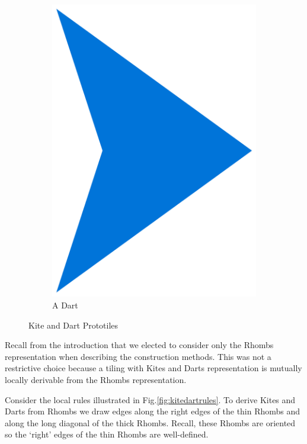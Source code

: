 \documentclass[
  oneside,
  11pt, a4paper,
  footinclude=true,
  headinclude=true,
  cleardoublepage=empty
]{scrbook}
\begin{document}
\begin{figure}[H]
\begin{subfigure}[t]{0.2\textwidth}
\includegraphics[width=\textwidth]{dart}
\caption{A Dart}
\end{subfigure}
\caption{Kite and Dart Prototiles}
\label{fig:kitedart}
\end{figure}

Recall from the introduction that we elected to consider only the Rhombs representation when describing the construction methods. This was not a restrictive choice because a tiling with Kites and Darts representation is mutually locally derivable from the Rhombs representation.

Consider the local rules illustrated in Fig.\ref{fig:kitedartrules}. To derive Kites and Darts from Rhombs we draw edges along the right edges of the thin Rhombs and along the long diagonal of the thick Rhombs. Recall, these Rhombs are oriented so the `right' edges of the thin Rhombs are well-defined. 
\end{document}
